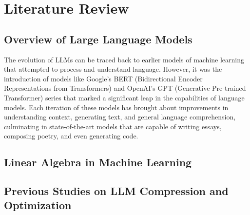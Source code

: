 \chapter{Literature Review}

\section{Overview of Large Language Models}
    The evolution of LLMs can be traced back to earlier models of machine learning that attempted to process and understand language. However, it was the introduction of models like Google's BERT (Bidirectional Encoder Representations from Transformers) and OpenAI's GPT (Generative Pre-trained Transformer) series that marked a significant leap in the capabilities of language models. Each iteration of these models has brought about improvements in understanding context, generating text, and general language comprehension, culminating in state-of-the-art models that are capable of writing essays, composing poetry, and even generating code.

\section{Linear Algebra in Machine Learning}

\section{Previous Studies on LLM Compression and Optimization}